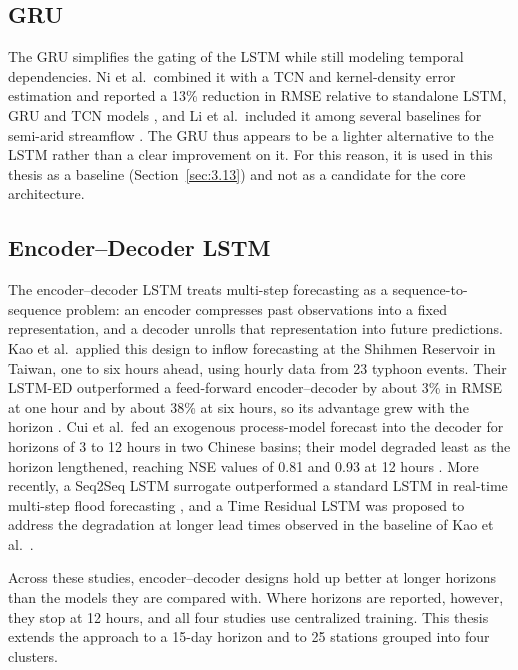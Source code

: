 \subsection{GRU}
\label{sec:2.6.2}

The GRU simplifies the gating of the LSTM while still modeling temporal
dependencies. Ni et al.\ combined it with a TCN and kernel-density error
estimation and reported a 13\% reduction in RMSE relative to standalone LSTM,
GRU and TCN models \cite{Ni2024}, and Li et al.\ included it among several
baselines for semi-arid streamflow \cite{Li2024}. The GRU thus appears to be a
lighter alternative to the LSTM rather than a clear improvement on it. For this
reason, it is used in this thesis as a baseline (Section~\ref{sec:3.13}) and
not as a candidate for the core architecture.

\subsection{Encoder--Decoder LSTM}
\label{sec:2.6.3}

The encoder--decoder LSTM treats multi-step forecasting as a
sequence-to-sequence problem: an encoder compresses past observations into a
fixed representation, and a decoder unrolls that representation into future
predictions. Kao et al.\ applied this design to inflow forecasting at the
Shihmen Reservoir in Taiwan, one to six hours ahead, using hourly data from 23
typhoon events. Their LSTM-ED outperformed a feed-forward encoder--decoder by
about 3\% in RMSE at one hour and by about 38\% at six hours, so its advantage
grew with the horizon \cite{Kao2020}. Cui et al.\ fed an exogenous
process-model forecast into the decoder for horizons of 3 to 12 hours in two
Chinese basins; their model degraded least as the horizon lengthened, reaching
NSE values of 0.81 and 0.93 at 12 hours \cite{Cui2022}. More recently, a
Seq2Seq LSTM surrogate outperformed a standard LSTM in real-time multi-step
flood forecasting \cite{Lim2025}, and a Time Residual LSTM was proposed to
address the degradation at longer lead times observed in the baseline of Kao
et al.\ \cite{Kao2020,Yuan2023}.

Across these studies, encoder--decoder designs hold up better at longer
horizons than the models they are compared with. Where horizons are reported,
however, they stop at 12 hours, and all four studies use centralized training.
This thesis extends the approach to a 15-day horizon and to 25 stations
grouped into four clusters.

